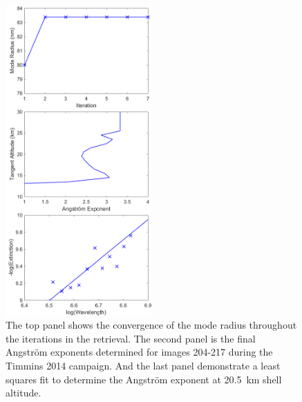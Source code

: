 \documentclass[12pt]{article}
\begin{document}


\newpage

\begin{figure}
\includegraphics[width=0.5\textwidth]{./Images/5-4-ParticalSize.pdf}
    \caption{The top panel shows the convergence of the mode radius throughout the iterations in the retrieval. The second panel is the final Angstr\"{o}m exponents determined for images 204-217 during the Timmins 2014 campaign. And the last panel demonstrate a least squares fit to determine the Angstr\"{o}m exponent at 20.5~km shell altitude.}
    \label{fig:ParticleSize}
\end{figure}
\end{document}
